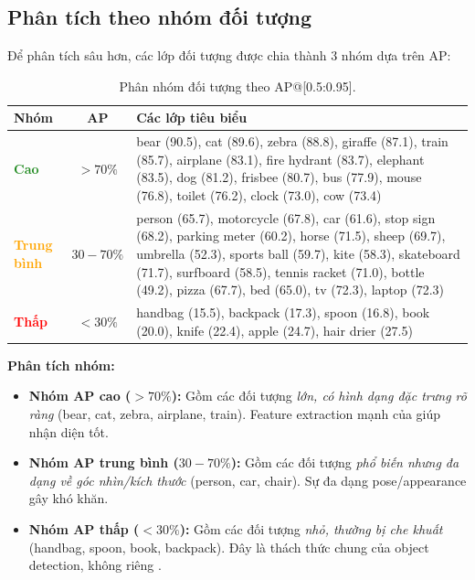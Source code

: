 \subsection{Phân tích theo nhóm đối tượng}

Để phân tích sâu hơn, các lớp đối tượng được chia thành 3 nhóm dựa trên AP:

\begin{table}[H]
\centering
\caption{Phân nhóm đối tượng theo AP@[0.5:0.95].}
\label{tab:coco_groups}
\begin{tabularx}{\textwidth}{l c X}
\toprule
\textbf{Nhóm} & \textbf{AP} & \textbf{Các lớp tiêu biểu} \\
\midrule
\textcolor{ForestGreen}{\textbf{Cao}} & $> 70\%$ & bear (90.5), cat (89.6), zebra (88.8), giraffe (87.1), train (85.7), airplane (83.1), fire hydrant (83.7), elephant (83.5), dog (81.2), frisbee (80.7), bus (77.9), mouse (76.8), toilet (76.2), clock (73.0), cow (73.4) \\
\midrule
\textcolor{orange}{\textbf{Trung bình}} & $30-70\%$ & person (65.7), motorcycle (67.8), car (61.6), stop sign (68.2), parking meter (60.2), horse (71.5), sheep (69.7), umbrella (52.3), sports ball (59.7), kite (58.3), skateboard (71.7), surfboard (58.5), tennis racket (71.0), bottle (49.2), pizza (67.7), bed (65.0), tv (72.3), laptop (72.3) \\
\midrule
\textcolor{red}{\textbf{Thấp}} & $< 30\%$ & handbag (15.5), backpack (17.3), spoon (16.8), book (20.0), knife (22.4), apple (24.7), hair drier (27.5) \\
\bottomrule
\end{tabularx}
\end{table}

\textbf{Phân tích nhóm:}
\begin{itemize}
    \item \textbf{Nhóm AP cao ($> 70\%$):} Gồm các đối tượng \textit{lớn, có hình dạng đặc trưng rõ ràng} (bear, cat, zebra, airplane, train). Feature extraction mạnh của \fastvit{} giúp nhận diện tốt.
    
    \item \textbf{Nhóm AP trung bình ($30-70\%$):} Gồm các đối tượng \textit{phổ biến nhưng đa dạng về góc nhìn/kích thước} (person, car, chair). Sự đa dạng pose/appearance gây khó khăn.
    
    \item \textbf{Nhóm AP thấp ($< 30\%$):} Gồm các đối tượng \textit{nhỏ, thường bị che khuất} (handbag, spoon, book, backpack). Đây là thách thức chung của object detection, không riêng \fastvit{}.
\end{itemize}

